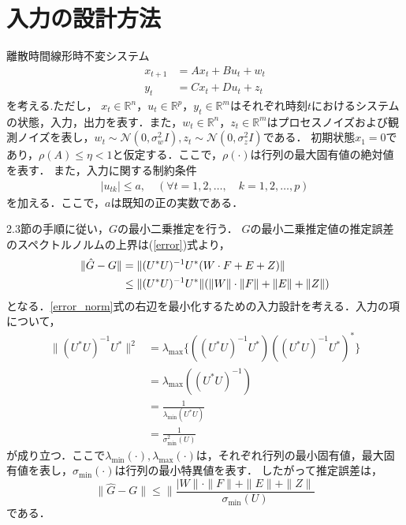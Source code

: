 \section{入力の設計方法}
離散時間線形時不変システム
\begin{align}
    \label{state2}
    x_{t+1} &= Ax_t + Bu_t + w_t \\
    \label{output2}
    y_t &= Cx_t + Du_t + z_t
\end{align}
を考える.ただし，
$x_t \in \mathbb{R}^n，u_t \in \mathbb{R}^p，y_t \in \mathbb{R}^m$はそれぞれ時刻$t$におけるシステムの状態，入力，出力を表す．また，$w_t \in \mathbb{R}^n，z_t \in \mathbb{R}^m$はプロセスノイズおよび観測ノイズを表し，$w_t \sim \mathcal{N}(0, \sigma_w^2I), z_t \sim \mathcal{N}(0, \sigma_z^2I)$である．
初期状態$x_1 = 0$であり，$\rho(A) \leq \eta <1$と仮定する．ここで，$\rho(\cdot)$は行列の最大固有値の絶対値を表す．
また，入力に関する制約条件
\begin{align*}
    |u_{tk}| \leq a,  \quad (\forall t = 1, 2, \ldots,\quad  k = 1, 2, \ldots,p) 
\end{align*}
を加える．ここで，$a$は既知の正の実数である．

2.3節の手順に従い，$G$の最小二乗推定を行う．
$G$の最小二乗推定値の推定誤差のスペクトルノルムの上界は(\ref{error})式より，
\begin{align}
    \| \hat{G} - G \| &= \| (U^*U)^{-1}U^* (W \cdot F +E + Z) \| \notag\\
    \label{error_norm}
    &\leq \| (U^*U)^{-1}U^* \| (\|W\| \cdot \|F\| +\|E\| + \|Z\|) 
\end{align}
となる．\eqref{error_norm}式の右辺を最小化するための入力設計を考える．入力の項について，
\begin{align*}
    \| (U^*U)^{-1}U^* \|^2 &= \lambda_{\max}\{((U^*U)^{-1}U^*)((U^*U)^{-1}U^*)^* \}
    \\
    &=\lambda_{\max}((U^*U)^{-1} )
    \\
    &= \frac{1}{\lambda_{\min}(U^*U)}
    \\
    &= \frac{1}{\sigma_{\min}^2(U)}
\end{align*}
が成り立つ．ここで$\lambda_{\min}(\cdot), \lambda_{\mathrm{max}}(\cdot)$は，それぞれ行列の最小固有値，最大固有値を表し，$\sigma_{\min}(\cdot)$は行列の最小特異値を表す．
したがって推定誤差は，
\begin{equation}
    \| \hat{G} - G \| \leq \| \frac{|W\| \cdot \|F\| +\|E\| + \|Z\|}{\sigma_{\min}(U)}
\end{equation}
である．

